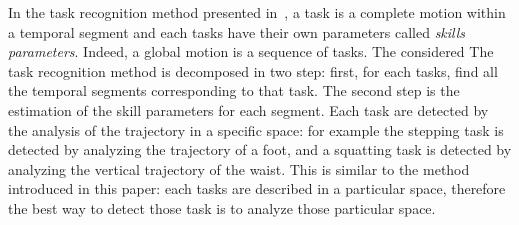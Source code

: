 \documentclass[letterpaper, 10pt, conference]{ieeeconf}      %
\begin{document}
In the task recognition method presented in~\cite{nakaoka07}, a task is
a complete motion within a temporal segment and each tasks have their own
parameters called \emph{skills parameters}. Indeed, a global motion is a sequence of
tasks. The considered The task recognition method is decomposed in two step: 
first, for each tasks, find all the temporal segments corresponding to that task.
The second step is the estimation of the skill parameters for each segment.
Each task are detected by the analysis of the trajectory in a specific space:
for example the stepping task is detected by analyzing the trajectory  of a foot,
and a squatting task is detected by analyzing the vertical trajectory of the waist.
This is similar to the method introduced in this paper: each tasks are described in a particular
space, therefore the best way to detect those task is to analyze
those particular space.
\end{document}
